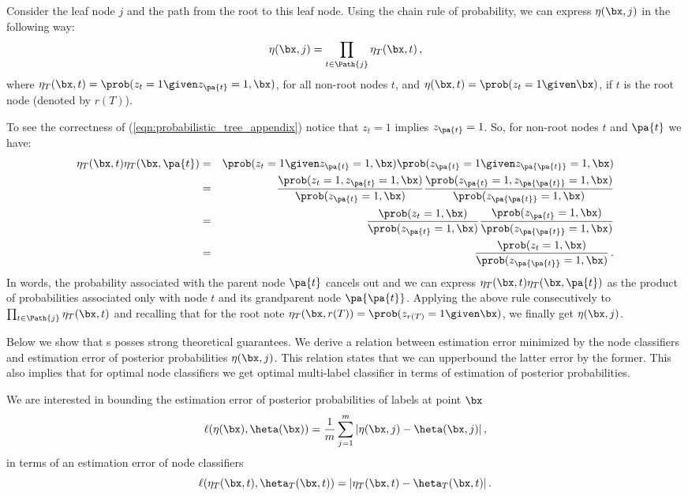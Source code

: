 Consider the leaf node $j$ and the path from the root to this leaf node. Using the chain rule of probability, we can express $\eta(\bx, j)$ in the following way:
\begin{equation}
\eta(\bx, j) = \prod_{t \in \Path{j}} \eta_T(\bx, t)\,,
\label{eqn:probabilistic_tree_appendix}
\end{equation}
where $\eta_T(\bx, t) = \prob(z_t = 1 \given z_{\pa{t}} =1, \bx)$, for all non-root nodes $t$, and $\eta(\bx, t) = \prob(z_t = 1 \given \bx)$, if $t$ is the root node (denoted by $r(T)$). 

To see the correctness of (\ref{eqn:probabilistic_tree_appendix}) notice that $z_{t} = 1$ implies $z_{\pa{t}} = 1$. So, for non-root nodes $t$ and $\pa{t}$ we have:
\begin{eqnarray*}
\eta_T(\bx,t) \eta_T(\bx, \pa{t}) & = &  \prob(z_t = 1 \given z_{\pa{t}} =1, \bx)\prob(z_{\pa{t}} = 1 \given z_{\pa{\pa{t}}} =1, \bx)\\
& = & \frac{\prob(z_t = 1 , z_{\pa{t}} =1, \bx)}{\prob(z_{\pa{t}} =1, \bx)} \frac{\prob(z_{\pa{t}} = 1, z_{\pa{\pa{t}}} =1, \bx)}{\prob(z_{\pa{\pa{t}}} =1, \bx)} \\
& = & \frac{\prob(z_t = 1, \bx)}{\prob(z_{\pa{t}} =1, \bx)} \frac{\prob(z_{\pa{t}} = 1, \bx)}{\prob(z_{\pa{\pa{t}}} =1, \bx)} \\
& = & \frac{\prob(z_t = 1, \bx)}{\prob(z_{\pa{\pa{t}}} =1, \bx)} \,.
\end{eqnarray*}
In words, the probability associated with the parent node $\pa{t}$ cancels out and we can express $\eta_T(\bx,t) \eta_T(\bx, \pa{t})$ as the product of probabilities associated only with node $t$ and its grandparent node $\pa{\pa{t}}$. 
%
Applying the above rule consecutively to $\prod_{t \in \Path{j}} \eta_T(\bx, t)$ and recalling that for the root note $\eta_T(\bx, r(T)) = \prob(z_{r(T)} = 1 \given \bx)$, we finally get $\eta(\bx, j)$. 

Below we show that s posses strong theoretical guarantees. We derive a relation between  estimation error minimized by the node classifiers and estimation error of posterior probabilities $\eta(\bx,j)$. This relation states that we can upperbound the latter error by the former. This also implies that for optimal node classifiers we get optimal multi-label classifier in terms of estimation of posterior probabilities.


We are interested in bounding the estimation error of posterior probabilities of labels at point $\bx$
$$
\ell(\eta(\bx),\heta(\bx)) = \frac{1}{m} \sum_{j=1}^m |\eta(\bx, j) - \heta(\bx, j)| \,,
$$
in terms of an estimation error of node classifiers
$$
\ell(\eta_T(\bx, t), \heta_T(\bx, t)) = |\eta_T(\bx, t) - \heta_T(\bx, t)  | \,.
$$

